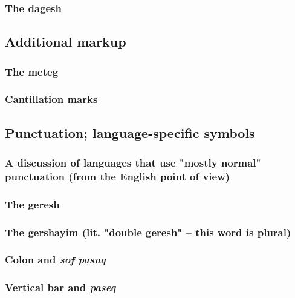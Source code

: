 \documentclass[11pt]{article}
\begin{document}
\subsubsection{The dagesh}
\label{sec:org9121e12}

\subsection{Additional markup}
\label{sec:orgda0915c}

\subsubsection{The meteg}
\label{sec:orgfe72f12}

\subsubsection{Cantillation marks}
\label{sec:orgf8b0d0f}

\subsection{Punctuation; language-specific symbols}
\label{sec:orgfd2a5c2}

\subsubsection{A discussion of languages that use "mostly normal" punctuation (from the English point of view)}
\label{sec:orgd8d5adb}

\subsubsection{The geresh}
\label{sec:orgaa31b40}

\subsubsection{The gershayim (lit. "double geresh" -- this word is plural)}
\label{sec:org72de120}

\subsubsection{Colon and \emph{sof pasuq}}
\label{sec:org14f7e7d}

\subsubsection{Vertical bar and \emph{paseq}}
\label{sec:orga73dae5}
\end{document}

